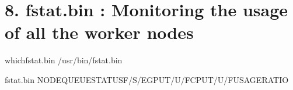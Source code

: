 \documentclass[a4paper,11pt,english]{sphinxmanual}
\begin{document}
\section{8. fstat.bin : Monitoring the usage of all the worker nodes}
\label{\detokenize{newfarm:fstat-bin-monitoring-the-usage-of-all-the-worker-nodes}}
\begin{sphinxVerbatim}[commandchars=\\\{\}]
\PYGZdl{}\PYGZgt{}whichfstat.bin
/usr/bin/fstat.bin

\PYGZdl{}\PYGZgt{}fstat.bin
\PYGZhy{}\PYGZhy{}\PYGZhy{}\PYGZhy{}\PYGZhy{}\PYGZhy{}\PYGZhy{}\PYGZhy{}\PYGZhy{}\PYGZhy{}\PYGZhy{}\PYGZhy{}\PYGZhy{}\PYGZhy{}\PYGZhy{}\PYGZhy{}\PYGZhy{}\PYGZhy{}\PYGZhy{}\PYGZhy{}\PYGZhy{}\PYGZhy{}\PYGZhy{}\PYGZhy{}\PYGZhy{}\PYGZhy{}\PYGZhy{}\PYGZhy{}\PYGZhy{}\PYGZhy{}\PYGZhy{}\PYGZhy{}\PYGZhy{}\PYGZhy{}\PYGZhy{}\PYGZhy{}\PYGZhy{}\PYGZhy{}\PYGZhy{}\PYGZhy{}\PYGZhy{}\PYGZhy{}\PYGZhy{}\PYGZhy{}\PYGZhy{}\PYGZhy{}\PYGZhy{}\PYGZhy{}\PYGZhy{}\PYGZhy{}\PYGZhy{}\PYGZhy{}\PYGZhy{}\PYGZhy{}\PYGZhy{}\PYGZhy{}\PYGZhy{}\PYGZhy{}\PYGZhy{}\PYGZhy{}\PYGZhy{}\PYGZhy{}\PYGZhy{}\PYGZhy{}\PYGZhy{}\PYGZhy{}\PYGZhy{}\PYGZhy{}\PYGZhy{}\PYGZhy{}\PYGZhy{}\PYGZhy{}\PYGZhy{}\PYGZhy{}\PYGZhy{}\PYGZhy{}\PYGZhy{}\PYGZhy{}\PYGZhy{}\PYGZhy{}\PYGZhy{}\PYGZhy{}\PYGZhy{}\PYGZhy{}\PYGZhy{}\PYGZhy{}\PYGZhy{}\PYGZhy{}\PYGZhy{}\PYGZhy{}\PYGZhy{}\PYGZhy{}\PYGZhy{}\PYGZhy{}\PYGZhy{}\PYGZhy{}\PYGZhy{}\PYGZhy{}\PYGZhy{}\PYGZhy{}\PYGZhy{}\PYGZhy{}\PYGZhy{}\PYGZhy{}\PYGZhy{}\PYGZhy{}\PYGZhy{}\PYGZhy{}\PYGZhy{}\PYGZhy{}\PYGZhy{}\PYGZhy{}\PYGZhy{}\PYGZhy{}\PYGZhy{}\PYGZhy{}\PYGZhy{}\PYGZhy{}\PYGZhy{}\PYGZhy{}
NODEQUEUESTATUSF/S/E\PYG{o}{[}GPU\PYG{o}{]}T/U/F\PYG{o}{[}CPU\PYG{o}{]}T/U/FUSAGERATIO
\PYGZhy{}\PYGZhy{}\PYGZhy{}\PYGZhy{}\PYGZhy{}\PYGZhy{}\PYGZhy{}\PYGZhy{}\PYGZhy{}\PYGZhy{}\PYGZhy{}\PYGZhy{}\PYGZhy{}\PYGZhy{}\PYGZhy{}\PYGZhy{}\PYGZhy{}\PYGZhy{}\PYGZhy{}\PYGZhy{}\PYGZhy{}\PYGZhy{}\PYGZhy{}\PYGZhy{}\PYGZhy{}\PYGZhy{}\PYGZhy{}\PYGZhy{}\PYGZhy{}\PYGZhy{}\PYGZhy{}\PYGZhy{}\PYGZhy{}\PYGZhy{}\PYGZhy{}\PYGZhy{}\PYGZhy{}\PYGZhy{}\PYGZhy{}\PYGZhy{}\PYGZhy{}\PYGZhy{}\PYGZhy{}\PYGZhy{}\PYGZhy{}\PYGZhy{}\PYGZhy{}\PYGZhy{}\PYGZhy{}\PYGZhy{}\PYGZhy{}\PYGZhy{}\PYGZhy{}\PYGZhy{}\PYGZhy{}\PYGZhy{}\PYGZhy{}\PYGZhy{}\PYGZhy{}\PYGZhy{}\PYGZhy{}\PYGZhy{}\PYGZhy{}\PYGZhy{}\PYGZhy{}\PYGZhy{}\PYGZhy{}\PYGZhy{}\PYGZhy{}\PYGZhy{}\PYGZhy{}\PYGZhy{}\PYGZhy{}\PYGZhy{}\PYGZhy{}\PYGZhy{}\PYGZhy{}\PYGZhy{}\PYGZhy{}\PYGZhy{}\PYGZhy{}\PYGZhy{}\PYGZhy{}\PYGZhy{}\PYGZhy{}\PYGZhy{}\PYGZhy{}\PYGZhy{}\PYGZhy{}\PYGZhy{}\PYGZhy{}\PYGZhy{}\PYGZhy{}\PYGZhy{}\PYGZhy{}\PYGZhy{}\PYGZhy{}\PYGZhy{}\PYGZhy{}\PYGZhy{}\PYGZhy{}\PYGZhy{}\PYGZhy{}\PYGZhy{}\PYGZhy{}\PYGZhy{}\PYGZhy{}\PYGZhy{}\PYGZhy{}\PYGZhy{}\PYGZhy{}\PYGZhy{}\PYGZhy{}\PYGZhy{}\PYGZhy{}\PYGZhy{}\PYGZhy{}\PYGZhy{}\PYGZhy{}\PYGZhy{}

\end{sphinxVerbatim}
\end{document}
